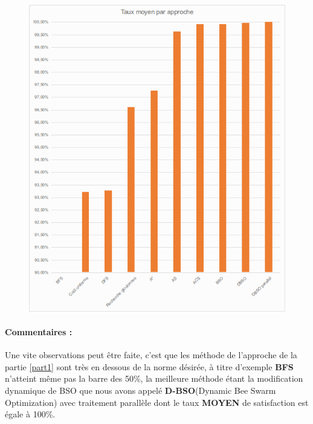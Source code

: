 \begin{figure}[H]
	\includegraphics[width=\textwidth]{images/battleRoyale.png}
\end{figure}


\paragraph{Commentaires : }
Une vite observations peut être faite, c'est que les méthode de l'approche de la partie \ref{part1} sont très en dessous de la norme désirée, à titre d'exemple \textbf{BFS} n'atteint même pas la barre des 50\%, la meilleure méthode étant la modification dynamique de BSO que nous avons appelé \textbf{D-BSO}(Dynamic Bee Swarm Optimization) avec traitement parallèle dont le taux \textbf{MOYEN} de satisfaction est égale à 100\%.
